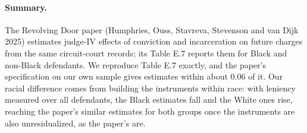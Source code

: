 \documentclass[11pt]{article}
\begin{document}
\paragraph{Summary.} The Revolving Door paper (Humphries, Ouss, Stavreva, Stevenson and van Dijk 2025) estimates judge-IV effects of conviction and incarceration on future charges from the same circuit-court records; its Table E.7 reports them for Black and non-Black defendants. We reproduce Table E.7 exactly, and the paper's specification on our own sample gives estimates within about 0.06 of it. Our racial difference comes from building the instruments within race: with leniency measured over all defendants, the Black estimates fall and the White ones rise, reaching the paper's similar estimates for both groups once the instruments are also unresidualized, as the paper's are.
\end{document}
